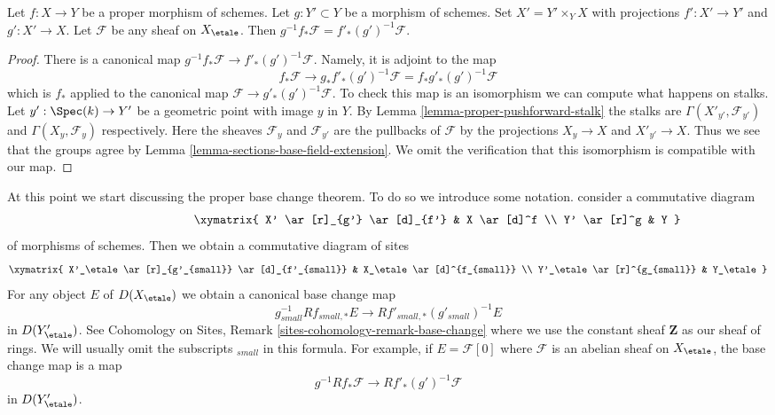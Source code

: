 \begin{lemma}
\label{lemma-proper-base-change-f-star}
Let $f : X \to Y$ be a proper morphism of schemes. Let $g : Y' \subset Y$
be a morphism of schemes. Set $X' = Y' \times_Y X$ with projections
$f' : X' \to Y'$ and $g' : X' \to X$. Let $\mathcal{F}$ be any sheaf on
$X_\etale$. Then $g^{-1}f_*\mathcal{F} = f'_*(g')^{-1}\mathcal{F}$.
\end{lemma}

\begin{proof}
There is a canonical map $g^{-1}f_*\mathcal{F} \to f'_*(g')^{-1}\mathcal{F}$.
Namely, it is adjoint to the map
$$
f_*\mathcal{F} \longrightarrow
g_*f'_*(g')^{-1}\mathcal{F} = f_*g'_*(g')^{-1}\mathcal{F}
$$
which is $f_*$ applied to the canonical map
$\mathcal{F} \to g'_*(g')^{-1}\mathcal{F}$. To check this map is an
isomorphism we can compute what happens on stalks.
Let $y' : \Spec(k) \to Y'$ be a geometric point with image $y$ in $Y$.
By Lemma \ref{lemma-proper-pushforward-stalk} the stalks are
$\Gamma(X'_{y'}, \mathcal{F}_{y'})$ and $\Gamma(X_y, \mathcal{F}_y)$
respectively. Here the sheaves $\mathcal{F}_y$ and $\mathcal{F}_{y'}$
are the pullbacks of $\mathcal{F}$ by the projections $X_y \to X$
and $X'_{y'} \to X$. Thus we see that the groups agree by
Lemma \ref{lemma-sections-base-field-extension}. We omit the
verification that this isomorphism is compatible with our map.
\end{proof}


\noindent
At this point we start discussing the proper base change theorem.
To do so we introduce some notation. consider a commutative diagram
\begin{equation}
\label{equation-base-change-diagram}
\vcenter{
\xymatrix{
X' \ar[r]_{g'} \ar[d]_{f'} & X \ar[d]^f \\
Y' \ar[r]^g & Y
}
}
\end{equation}
of morphisms of schemes. Then we obtain a commutative diagram of sites
$$
\xymatrix{
X'_\etale \ar[r]_{g'_{small}} \ar[d]_{f'_{small}} &
X_\etale \ar[d]^{f_{small}} \\
Y'_\etale \ar[r]^{g_{small}} &
Y_\etale
}
$$
For any object $E$ of $D(X_\etale)$ we obtain a canonical base change map
\begin{equation}
\label{equation-base-change}
g_{small}^{-1}Rf_{small, *}E \longrightarrow Rf'_{small, *}(g'_{small})^{-1}E
\end{equation}
in $D(Y'_\etale)$. See Cohomology on Sites, Remark
\ref{sites-cohomology-remark-base-change} where we use the constant
sheaf $\mathbf{Z}$ as our sheaf of rings.
We will usually omit the subscripts ${}_{small}$ in this formula.
For example, if $E = \mathcal{F}[0]$ where $\mathcal{F}$ is an abelian
sheaf on $X_\etale$, the base change map is a map
\begin{equation}
\label{equation-base-change-sheaf}
g^{-1}Rf_*\mathcal{F} \longrightarrow Rf'_*(g')^{-1}\mathcal{F}
\end{equation}
in $D(Y'_\etale)$.

